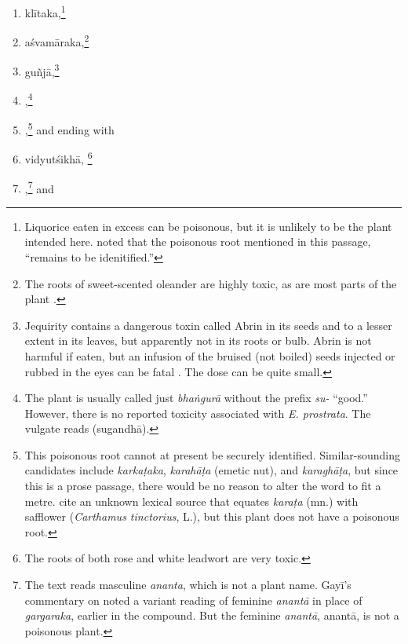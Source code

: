 \begin{translation}
\begin{itemize}
\begin{enumerate}
        \item  \gls{klītaka},\footnote{Liquorice eaten in excess can
    be poisonous, but it is unlikely to be the plant intended
    here.  \citet[124]{gvdb} noted that the poisonous root
    mentioned in this passage, “remains to be idenitified.”}
       
        \item \gls{aśvamāraka},\footnote{The roots of sweet-scented
    oleander are highly toxic, as are most parts of the plant
    \citep{pill-2019}.}
    
        \item \gls{guñjā},\footnote{Jequirity contains a dangerous
    toxin called Abrin in its seeds and to a lesser extent in its
    leaves, but apparently not in its roots or bulb. Abrin is not
    harmful if eaten, but an infusion of the bruised (not boiled)
    seeds injected or rubbed in the eyes can be fatal \citep[\#
    6]{NK}.  The dose can be quite small.}
        
        \item {},\footnote{The plant is usually
    called just \emph{bhaṅgurā} without the prefix \emph{su-}
    “good.”  However, there is no reported toxicity associated
    with \emph{E. prostrata}.  The vulgate reads 
    (\gls{sugandhā}).}
        
       \item {},\footnote{This poisonous root cannot
    at present be securely identified.  Similar-sounding candidates
    include \emph{karkaṭaka}, \emph{karahāṭa} (emetic nut), and
    \emph{karaghāṭa}, but since this is a prose passage, there
    would be no reason to alter the word to fit a metre.
    \citet[255]{moni-sans} cite an unknown lexical source that
    equates \emph{karaṭa} (mn.) with safflower (\emph{Carthamus
    tinctorius}, L.), but this plant does not have a poisonous
    root.} %
    and ending with %
    \item \gls{vidyutśikhā},%
    \footnote{The roots of both rose and white leadwort are very toxic.}

\item {},\footnote{The text reads masculine
    \emph{ananta}, which is not a plant name.  Gayī's commentary on
     noted a variant reading of feminine \emph{anantā} in
    place of \emph{gargaraka}, earlier in the compound. But the feminine
    \emph{anantā}, \gls{anantā}, is not a poisonous plant.} and


\end{enumerate}
\end{itemize}
\end{translation}
